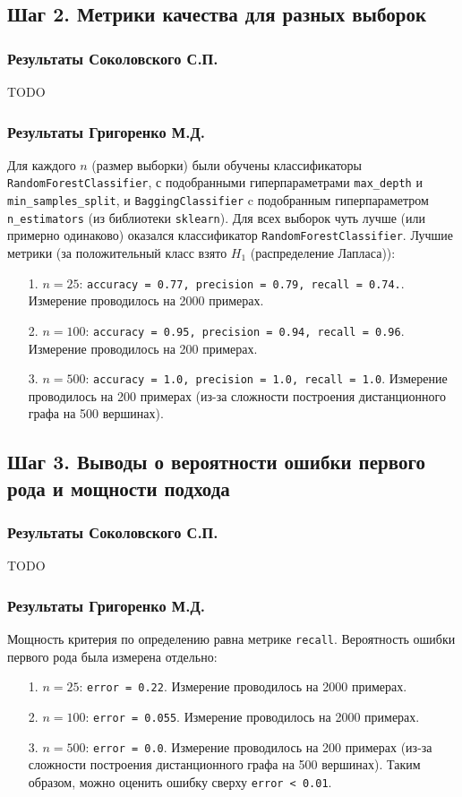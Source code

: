 \documentclass[a4paper,12pt]{article}
\begin{document}
\subsection{Шаг 2. Метрики качества для разных выборок}
\subsubsection*{Результаты Соколовского С.П.}
TODO

\subsubsection*{Результаты Григоренко М.Д.}
Для каждого $n$ (размер выборки) были обучены классификаторы \texttt{RandomForestClassifier}, с подобранными гиперпараметрами \texttt{max\_depth} и \texttt{min\_samples\_split}, и \texttt{BaggingClassifier} c подобранным гиперпараметром \texttt{n\_estimators} (из библиотеки \texttt{sklearn}). Для всех выборок чуть лучше (или примерно одинаково) оказался классификатор \texttt{RandomForestClassifier}. Лучшие метрики (за положительный класс взято $H_1$ (распределение Лапласа)):
\begin{itemize}
    \item[1.] $n = 25$: \texttt{accuracy = 0.77, precision = 0.79, recall = 0.74.}. Измерение проводилось на 2000 примерах.
    \item[2.] $n = 100$: \texttt{accuracy = 0.95, precision = 0.94, recall = 0.96}. Измерение проводилось на 200 примерах.
    \item[3.] $n = 500$: \texttt{accuracy = 1.0, precision = 1.0, recall = 1.0}. Измерение проводилось на 200 примерах (из-за сложности построения дистанционного графа на 500 вершинах).
\end{itemize}

\subsection{Шаг 3. Выводы о вероятности ошибки первого рода и мощности подхода}
\subsubsection*{Результаты Соколовского С.П.}
TODO

\subsubsection*{Результаты Григоренко М.Д.}
Мощность критерия по определению равна метрике \texttt{recall}. Вероятность ошибки первого рода была измерена отдельно:
\begin{itemize}
    \item[1.] $n = 25$: \texttt{error = 0.22}. Измерение проводилось на 2000 примерах.
    \item[2.] $n = 100$: \texttt{error = 0.055}. Измерение проводилось на 2000 примерах.
    \item[3.] $n = 500$: \texttt{error = 0.0}. Измерение проводилось на 200 примерах (из-за сложности построения дистанционного графа на 500 вершинах). Таким образом, можно оценить ошибку сверху \texttt{error < 0.01}.
\end{itemize}
\end{document}
